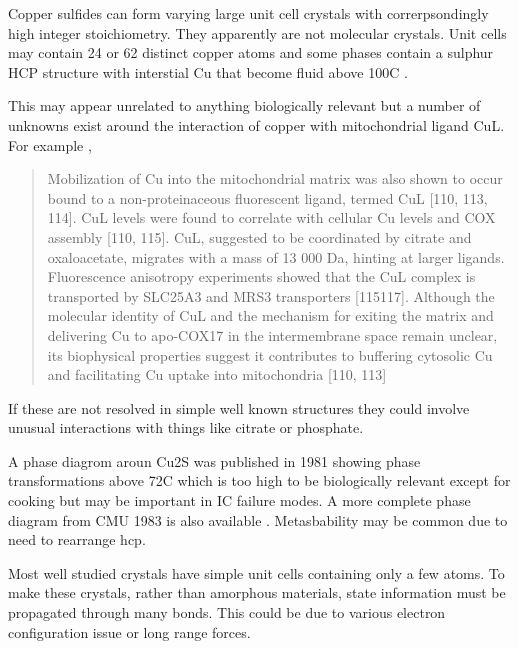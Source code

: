 Copper sulfides can form varying large unit cell crystals 
with correrpsondingly high integer stoichiometry. 
They apparently are not molecular crystals.
Unit cells may contain 24 or 62 distinct copper atoms and some phases
contain a sulphur HCP structure with interstial Cu that become
fluid above 100C \cite{Evans_crystal_structures_}.

This may appear unrelated to anything biologically relevant
but a number of unknowns exist around the interaction of copper
with mitochondrial ligand CuL. For example
\cite{Fitisemanu_PadillaBenavides_Emerging_perspectives_copper_2024},
\begin{quote}
Mobilization of Cu into the mitochondrial matrix was also shown to occur
bound to a non-proteinaceous fluorescent ligand, termed CuL {[}110, 113,
114{]}. CuL levels were found to correlate with cellular Cu levels and COX
assembly {[}110, 115{]}. CuL, suggested to be coordinated by citrate and
oxaloacetate, migrates with a mass of 13 000 Da, hinting at larger ligands.
Fluorescence anisotropy experiments showed that the CuL complex is transported
by SLC25A3 and MRS3 transporters {[}115117{]}. Although the molecular identity
of CuL and the mechanism for exiting the matrix and delivering Cu to apo-COX17
in the intermembrane space remain unclear, its biophysical properties suggest
it contributes to buffering cytosolic Cu and facilitating Cu uptake into
mitochondria {[}110, 113{]}
\end{quote}

If these are not resolved in simple well known structures they could
involve unusual interactions with things like citrate or phosphate.


A phase diagrom aroun Cu2S was published in 1981
showing phase transformations above 72C
\cite{Evans1981CopperCI} which is too high to be biologically
relevant except for cooking but may be important
in IC failure modes. 
A more complete phase diagram from CMU 1983 is also available
\cite{Chakrabarti_Laughlin_Copper_1983}.
Metasbability may be common due to need to rearrange hcp.


Most well studied crystals have simple unit cells containing
only a few atoms. To make these crystals, rather than amorphous
materials, state information must be propagated through
many bonds. This could be due to various electron configuration
issue or long range forces. 


